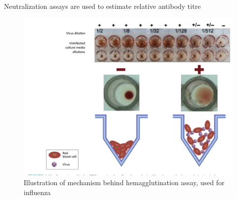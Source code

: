 \documentclass{beamer}
\begin{document}
\begin{frame}{Neutralization assays are used to estimate relative antibody titre}
    \begin{figure}
        \includegraphics[width=\textwidth]{2022-07-11-22-36-27.png}
        \caption{Illustration of mechanism behind hemagglutination assay, used for influenza}
    \end{figure}
    \centering
    \vfill
    \tiny{\cite{payne2017viruses}}
\end{frame}
\end{document}
